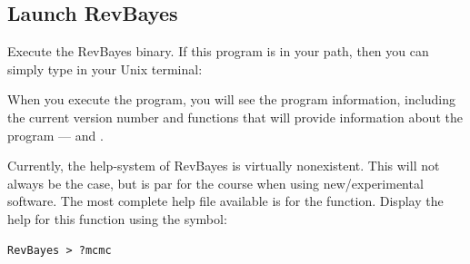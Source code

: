 

\bigskip
\subsection{Launch RevBayes}

Execute the RevBayes binary. If this program is in your path, then you can simply type in your Unix terminal:


When you execute the program, you will see the program information, including the current version number and functions that will provide information about the program ---  and . %
%


%
%
%

Currently, the help-system of RevBayes is virtually nonexistent. This will not always be the case, but is par for the course when using new/experimental software. 
The most complete help file available is for the  function. Display the help for this function using the  symbol:
{\tt \begin{snugshade*}
\begin{lstlisting}
RevBayes > ?mcmc
\end{lstlisting}
\end{snugshade*}}

